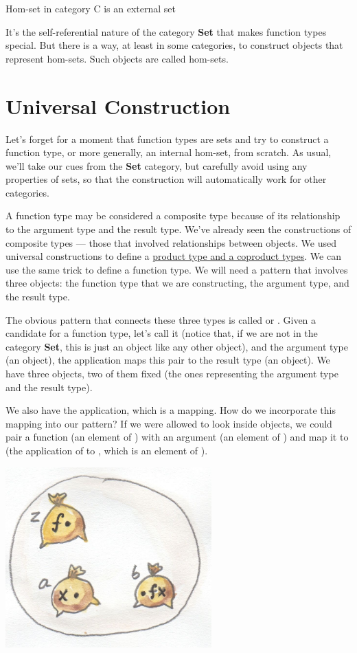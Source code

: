 Hom-set in category C is an external set

It's the self-referential nature of the category \textbf{Set} that makes
function types special. But there is a way, at least in some categories,
to construct objects that represent hom-sets. Such objects are called
 hom-sets.

\section{Universal Construction}\label{universal-construction}

Let's forget for a moment that function types are sets and try to
construct a function type, or more generally, an internal hom-set, from
scratch. As usual, we'll take our cues from the \textbf{Set} category,
but carefully avoid using any properties of sets, so that the
construction will automatically work for other categories.

A function type may be considered a composite type because of its
relationship to the argument type and the result type. We've already
seen the constructions of composite types --- those that involved
relationships between objects. We used universal constructions to define
a
\href{https://bartoszmilewski.com/2015/01/07/products-and-coproducts/}{product
type and a coproduct types}. We can use the same trick to define a
function type. We will need a pattern that involves three objects: the
function type that we are constructing, the argument type, and the
result type.

The obvious pattern that connects these three types is called
 or . Given a candidate for
a function type, let's call it  (notice that, if we are not in
the category \textbf{Set}, this is just an object like any other
object), and the argument type  (an object), the application
maps this pair to the result type  (an object). We have three
objects, two of them fixed (the ones representing the argument type and
the result type).

We also have the application, which is a mapping. How do we incorporate
this mapping into our pattern? If we were allowed to look inside
objects, we could pair a function  (an element of )
with an argument  (an element of ) and map it to
 (the application of  to , which is an
element of ).

\hypertarget{attachment_4243}{}
\includegraphics[width=3.12500in]{images/functionset.jpg}

